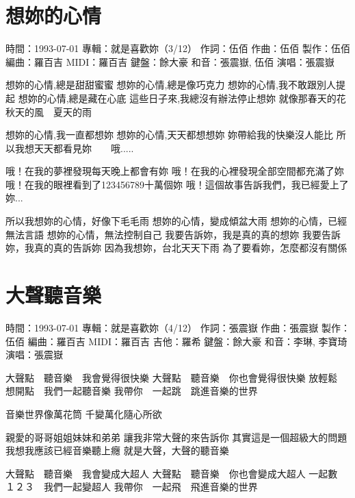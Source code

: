 \documentclass[UTF8,a4paper,oneside,twocolumn,12pt]{ctexbook}
\newcommand{\infopair}[2]{\textbullet #1：#2}
\newcommand{\zc}[1][伍佰]{\infopair{作詞}{#1}}
\newcommand{\zq}[1][伍佰]{\infopair{作曲}{#1}}
\newcommand{\bq}[1][伍佰]{\infopair{編曲}{#1}}
\newcommand{\zj}[1]{\infopair{專輯}{#1}}
\newcommand{\zz}[1]{\infopair{製作}{#1}}
\newcommand{\sj}[1]{\infopair{時間}{#1}}
\newenvironment{info}{\begin{flushleft}\kaishu
	}
	{\end{flushleft}\normalsize\yahei\par}
\newenvironment{lyric}{
	}
{}
\begin{document}
\section{想妳的心情}
\begin{info}
	\sj{1993-07-01}
	\zj{就是喜歡妳（3/12）}
	\zc
	\zq
	\zz{伍佰}
	\bq[羅百吉]
	\infopair{MIDI}{羅百吉}
	\infopair{鍵盤}{餘大豪}
	\infopair{和音}{張震嶽, 伍佰}
	\infopair{演唱}{張震嶽}
\end{info}
\begin{lyric}
	想妳的心情,總是甜甜蜜蜜
	想妳的心情,總是像巧克力
	想妳的心情,我不敢跟別人提起
	想妳的心情,總是藏在心底
	這些日子來,我總沒有辦法停止想妳
	就像那春天的花　秋天的風　夏天的雨

	想妳的心情,我一直都想妳
	想妳的心情,天天都想想妳
	妳帶給我的快樂沒人能比
	所以我想天天都看見妳　　哦.....

	哦！在我的夢裡發現每天晚上都會有妳
	哦！在我的心裡發現全部空間都充滿了妳
	哦！在我的眼裡看到了123456789十萬個妳
	哦！這個故事告訴我們，我已經愛上了妳...

	所以我想妳的心情，好像下毛毛雨
	想妳的心情，變成傾盆大雨
	想妳的心情，已經無法言語
	想妳的心情，無法控制自己
	我要告訴妳，我是真的真的想妳
	我要告訴妳，我真的真的告訴妳
	因為我想妳，台北天天下雨
	為了要看妳，怎麼都沒有關係
\end{lyric}

\section{大聲聽音樂}
\begin{info}
	\sj{1993-07-01}
	\zj{就是喜歡妳（4/12）}
	\zc[張震嶽]
	\zq[張震嶽]
	\zz{伍佰}
	\bq[羅百吉]
	\infopair{MIDI}{羅百吉}
	\infopair{吉他}{羅希}
	\infopair{鍵盤}{餘大豪}
	\infopair{和音}{李琳, 李寶琦}
	\infopair{演唱}{張震嶽}
\end{info}
\begin{lyric}
	大聲點　聽音樂　我會覺得很快樂
	大聲點　聽音樂　你也會覺得很快樂
	放輕鬆　想開點　我們一起聽音樂
	我帶你　一起跳　跳進音樂的世界

	音樂世界像萬花筒
	千變萬化隨心所欲

	親愛的哥哥姐姐妹妹和弟弟
	讓我非常大聲的來告訴你
	其實這是一個超級大的問題
	我想我應該已經音樂聽上癮
	就是大聲，大聲的聽音樂

	大聲點　聽音樂　我會變成大超人
	大聲點　聽音樂　你也會變成大超人
	一起數　１２３　我們一起變超人
	我帶你　一起飛　飛進音樂的世界
\end{lyric}
\end{document}
